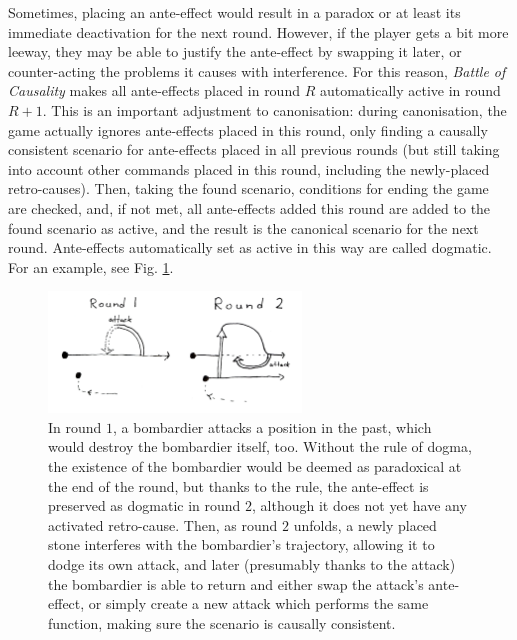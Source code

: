\documentclass[12pt]{article}
\begin{document}
	Sometimes, placing an ante-effect would result in a paradox or at least its immediate deactivation for the next round. However, if the player gets a bit more leeway, they may be able to justify the ante-effect by swapping it later, or counter-acting the problems it causes with interference. For this reason, \textit{Battle of Causality} makes all ante-effects placed in round $R$ automatically active in round $R+1$. This is an important adjustment to canonisation: during canonisation, the game actually ignores ante-effects placed in this round, only finding a causally consistent scenario for ante-effects placed in all previous rounds (but still taking into account other commands placed in this round, including the newly-placed retro-causes). Then, taking the found scenario, conditions for ending the game are checked, and, if not met, all ante-effects added this round are added to the found scenario as active, and the result is the canonical scenario for the next round. Ante-effects automatically set as active in this way are called dogmatic. For an example, see Fig. \ref{fig:dogma}.
	
	\begin{figure}[h]
\begin{center}
    \includegraphics[width=0.6\textwidth]{images/diag_dogma}
 \caption{In round $1$, a bombardier attacks a position in the past, which would destroy the bombardier itself, too. Without the rule of dogma, the existence of the bombardier would be deemed as paradoxical at the end of the round, but thanks to the rule, the ante-effect is preserved as dogmatic in round $2$, although it does not yet have any activated retro-cause. Then, as round $2$ unfolds, a newly placed stone interferes with the bombardier's trajectory, allowing it to dodge its own attack, and later (presumably thanks to the attack) the bombardier is able to return and either swap the attack's ante-effect, or simply create a new attack which performs the same function, making sure the scenario is causally consistent.}\label{fig:dogma}
\end{center}
\end{figure}
	
\end{document}
